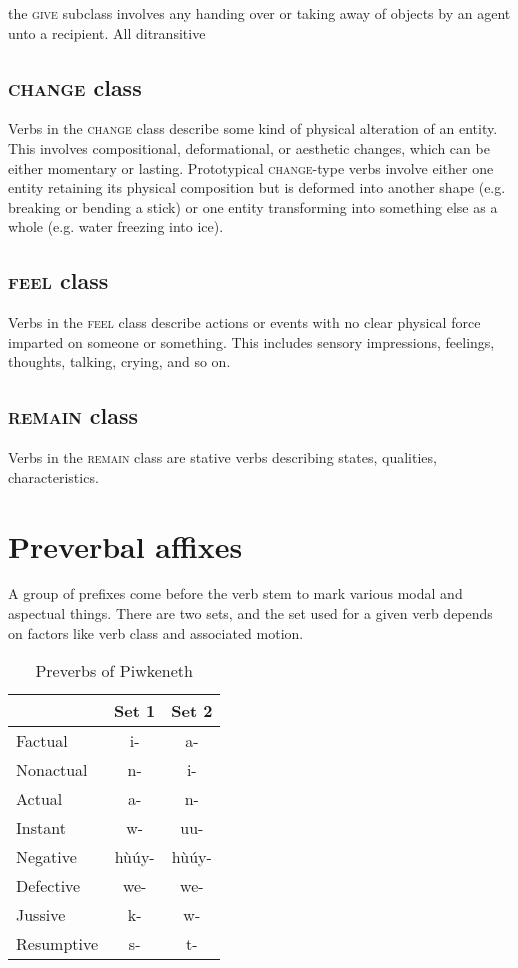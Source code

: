 \documentclass[smallroyalvopaper,9pt]{memoir} %
\newcommand{\lang}{Piwkeneth}
\begin{document}
the \textsc{give} subclass involves any handing over or taking away of objects by an agent unto a recipient. All ditransitive

\subsection{\textsc{change} class}

Verbs in the \textsc{change} class describe some kind of physical alteration of an entity. This involves compositional, deformational, or aesthetic changes, which can be either momentary or lasting. Prototypical \textsc{change}-type verbs involve either one entity retaining its physical composition but is deformed into another shape (e.g. breaking or bending a stick) or one entity transforming into something else as a whole (e.g. water freezing into ice).

\subsection{\textsc{feel} class}

Verbs in the \textsc{feel} class describe actions or events with no clear physical force imparted on someone or something. This includes sensory impressions, feelings, thoughts, talking, crying, and so on.

\subsection{\textsc{remain} class}

Verbs in the \textsc{remain} class are stative verbs describing states, qualities, characteristics.

\section{Preverbal affixes}

A group of prefixes come before the verb stem to mark various modal and aspectual things. There are two sets, and the set used for a given verb depends on factors like verb class and associated motion.

\begin{table}[ht]
    \centering
    \begin{tabular}{lcc}
        \toprule
                   & Set 1  & Set 2 \\
        \midrule
        Factual    & i-     & a- \\
        Nonactual  & n-     & i- \\
        Actual     & a-     & n- \\
        Instant    & w-     & uu- \\
        Negative   & hùúy-  & hùúy- \\
        Defective  & we-    & we- \\
        Jussive    & k-     & w- \\
        Resumptive & s-     & t- \\
        \bottomrule
    \end{tabular}
    \caption{Preverbs of \lang}
\end{table}
\end{document}
